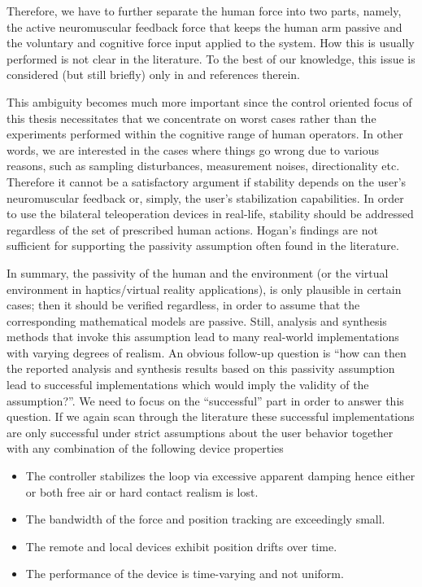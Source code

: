 Therefore, we have to further separate the human force into two parts, namely, the active neuromuscular feedback force that keeps the 
human arm passive and the voluntary and cognitive force input applied to the system. How this is usually performed is not clear in the 
literature. To the best of our knowledge, this issue is considered (but still briefly) only in \cite[Sec. II.B]{kazeroonitsay} and 
references therein.


This ambiguity becomes much more important since the control oriented focus of this thesis necessitates that we concentrate on
worst cases rather than the experiments performed within the cognitive range of human operators. In other words, we are interested in
the cases where things go wrong due to various reasons, such as sampling disturbances, measurement noises, directionality 
etc. Therefore it cannot be a satisfactory argument if stability depends on the user's neuromuscular feedback or, simply, the user's 
stabilization capabilities. In order to use the bilateral teleoperation devices in real-life, stability should be addressed 
regardless of the set of prescribed human actions. Hogan's findings are not sufficient for supporting the passivity assumption 
often found in the literature. 


In summary, the passivity of the human and the environment (or the virtual environment in haptics/virtual reality applications), is 
only plausible in certain cases; then it should be verified regardless, in order to assume that the corresponding mathematical models 
are passive. Still, analysis and synthesis methods that invoke this assumption lead to many real-world implementations 
with varying degrees of realism. An obvious follow-up question is \enquote{how can then the reported analysis and synthesis results
based on this passivity assumption lead to successful implementations which would imply the validity of the assumption?}. We need to 
focus on the \enquote{successful} part in order to answer this question. If we again scan through the literature these successful  
implementations are only successful under strict assumptions about the user behavior together with any combination of the following
device properties
\begin{itemize}
	\item The controller stabilizes the loop via excessive apparent damping hence either or both free air or hard contact realism is lost.
    \item The bandwidth of the force and position tracking are exceedingly small.
    \item The remote and local devices exhibit position drifts over time.
    \item The performance of the device is time-varying and not uniform.
\end{itemize}
 
